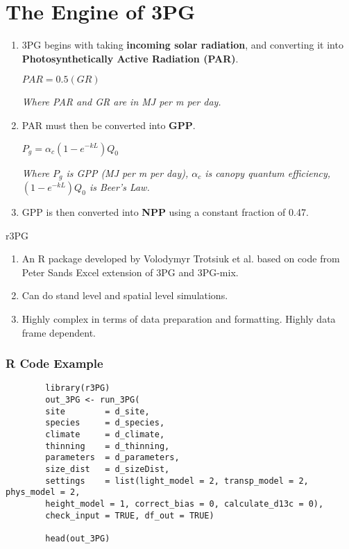 \documentclass[11pt]{beamer}
\begin{document}
\section{The Engine of 3PG} 
\begin{frame}
	\begin{enumerate}
		\item 3PG begins with taking \textbf{incoming solar radiation}, and converting it into \textbf{Photosynthetically Active Radiation (PAR)}.
		\begin{center}
			$PAR = 0.5(GR)$
		\end{center}
		\begin{center}
			\textit{Where PAR and GR are in MJ per m per day.}
		\end{center}
		\vspace{3mm}
		\item PAR must then be converted into \textbf{GPP}.
		\begin{center}
			$P_g = \alpha_c(1-e^{-kL})Q_0$
		\end{center}
		\begin{center}
			\textit{Where $P_g$ is GPP (MJ per m per day), $\alpha_c$ is canopy quantum efficiency, $(1-e^{-kL})Q_0$ is Beer's Law.}
		\end{center}
		\vspace{3mm}
		\item GPP is then converted into \textbf{NPP} using a constant fraction of 0.47.
	\end{enumerate}
\end{frame}

\begin{frame}{r3PG}
	\begin{enumerate}
	\item An R package developed by Volodymyr Trotsiuk et al. based on code from Peter Sands Excel extension of 3PG and 3PG-mix. 
	\item Can do stand level and spatial level simulations. 
	\item Highly complex in terms of data preparation and formatting. Highly data frame dependent.
	\end{enumerate}  
\end{frame}



\begin{frame}
	\frametitle{R Code Example}
		\begin{verbatim}
		library(r3PG)
		out_3PG <- run_3PG(
		site        = d_site, 
		species     = d_species, 
		climate     = d_climate, 
		thinning    = d_thinning,
		parameters  = d_parameters, 
		size_dist   = d_sizeDist,
		settings    = list(light_model = 2, transp_model = 2, phys_model = 2, 
		height_model = 1, correct_bias = 0, calculate_d13c = 0),
		check_input = TRUE, df_out = TRUE)
		
		head(out_3PG)
		\end{verbatim}
\end{frame}
\end{document}
